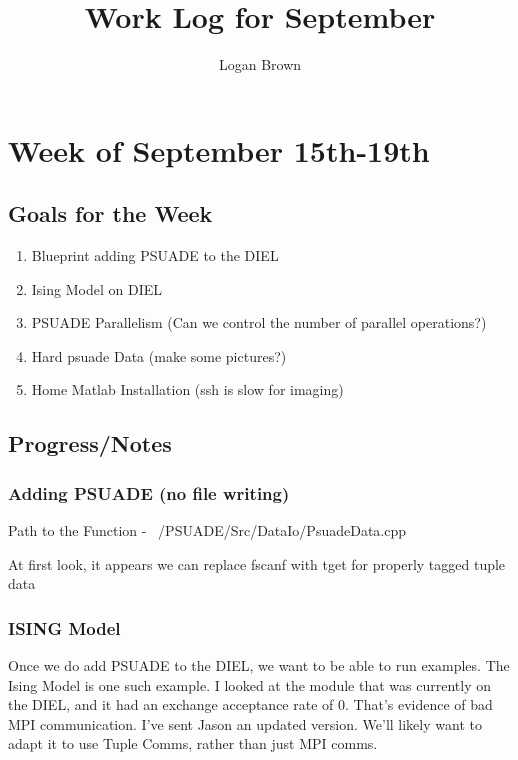 \documentclass[11pt]{article} %
\title{Work Log for September}
\author{Logan Brown}
\begin{document}
\maketitle


\setcounter{section}{2} %
\setcounter{subsection}{-1}
\setcounter{subsubsection}{0}

\section{Week of September 15th-19th}
\subsection{Goals for the Week}
\begin{enumerate}
	\item Blueprint adding PSUADE to the DIEL
	\item Ising Model on DIEL
	\item PSUADE Parallelism (Can we control the number of parallel operations?)
	\item Hard psuade Data (make some pictures?)
	\item Home Matlab Installation (ssh is slow for imaging)
\end{enumerate}


\subsection{Progress/Notes}

\subsubsection{Adding PSUADE (no file writing)}

Path to the Function - ~/PSUADE/Src/DataIo/PsuadeData.cpp



At first look, it appears we can replace fscanf with tget for properly tagged tuple data


\subsubsection{ISING Model}

Once we do add PSUADE to the DIEL, we want to be able to run examples. The Ising Model is one such example. I looked at the module that was currently on the DIEL, and it had an exchange acceptance rate of 0. That's evidence of bad MPI communication. I've sent Jason an updated version. We'll likely want to adapt it to use Tuple Comms, rather than just MPI comms.
\end{document}
